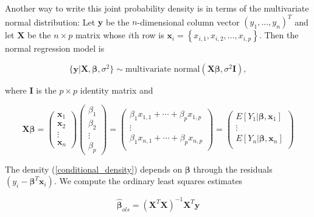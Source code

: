 \documentclass[12pt, a4paper]{article}
\begin{document}
Another way to write this joint probability density is in terms of the multivariate normal distribution:  Let $\mathbf{y}$ be the $n$-dimensional column vector $\left(y_1,...,y_n\right)^T$ and let $\mathbf{X}$ be the $n \times p$ matrix whose $i$th row is $\mathbf{x}_i = \left\{ x_{i,1}, x_{i,2}, ..., x_{i,p} \right\}$.  Then the normal regression model is

$$\{\mathbf{y}|\mathbf{X},\boldsymbol\beta,\sigma^2\} \sim \text{multivariate normal}\left(\mathbf{X}\boldsymbol\beta,\sigma^2\mathbf{I}\right),$$

where $\mathbf{I}$ is the $p \times p$ identity matrix and

\begin{equation*}
    \mathbf{X}\boldsymbol\beta =
    \begin{pmatrix}
        \mathbf{x}_1 \\
        \mathbf{x}_2 \\
        \vdots  \\
        \mathbf{x}_n
    \end{pmatrix}
    \begin{pmatrix}
        \beta_1 \\
        \beta_2 \\
        \vdots \\
        \beta_p
    \end{pmatrix}
    =
    \begin{pmatrix}
        \beta_1 x_{1,1} + \cdots + \beta_p x_{1,p} \\
        \vdots \\
        \beta_1 x_{n,1} + \cdots + \beta_p x_{n,p} \\
    \end{pmatrix}
    =
    \begin{pmatrix}
        E\left[Y_1|\mathbf{\boldsymbol\beta},\mathbf{x}_1\right] \\
        \vdots \\
        E\left[Y_n|\mathbf{\boldsymbol\beta},\mathbf{x}_n\right] \\
    \end{pmatrix}
\end{equation*}

The density (\ref{conditional_density}) depends on $\boldsymbol\beta$ through the residuals $\left(y_i - \boldsymbol\beta^T\mathbf{x}_i\right)$.  We compute the ordinary least squares estimates

$$\hat{\boldsymbol\beta}_{ols} = \left(\mathbf{X}^T\mathbf{X}\right)^{-1}\mathbf{X}^T\mathbf{y}$$
\end{document}
